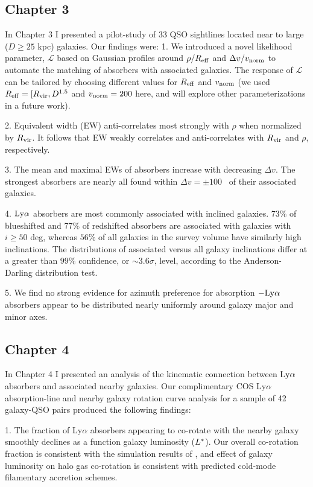 \subsection{Chapter 3}
In Chapter 3 I presented a pilot-study of 33 QSO sightlines located near to large ($D \ge 25$ kpc) galaxies. Our findings were:
1. We introduced a novel likelihood parameter, $\mathcal{L}$ based on Gaussian profiles around $\rho / R_{\rm eff}$ and $\Delta v / v_{\rm norm}$ to automate the matching of absorbers with associated galaxies. The response of $\mathcal{L}$ can be tailored by choosing different values for $R_{\rm eff}$ and $v_{\rm norm}$ (we used $R_{\rm eff} = [R_{\rm vir}, D^{\rm 1.5}$ and $v_{\rm norm} = 200$ \kms here, and will explore other parameterizations in a future work).

2. Equivalent width (EW) anti-correlates most strongly with $\rho$ when normalized by $R_{\rm vir}$. It follows that EW weakly correlates and anti-correlates with $R_{\rm vir}$ and $\rho$, respectively.

3. The mean and maximal EWs of absorbers increase with decreasing $\Delta v$. The strongest absorbers are nearly all found within $\Delta v = \pm 100$ \kms~of their associated galaxies.

4. $\rm Ly\alpha$ absorbers are most commonly associated with inclined galaxies. $73\%$ of blueshifted and $77\%$ of redshifted absorbers are associated with galaxies with $i \ge 50$ deg, whereas $56\%$ of all galaxies in the survey volume have similarly high inclinations. The distributions of associated versus all galaxy inclinations differ at a greater than $99\%$ confidence, or $\sim 3.6 \sigma$, level, according to the Anderson-Darling distribution test.

5. We find no strong evidence for azimuth preference for absorption $-\rm Ly\alpha$ absorbers appear to be distributed nearly uniformly around galaxy major and minor axes.

\subsection{Chapter 4}
In Chapter 4 I presented an analysis of the kinematic connection between $\rm Ly\alpha$ absorbers and associated nearby galaxies. Our complimentary COS Ly$\alpha$ absorption-line and nearby galaxy rotation curve analysis for a sample of 42 galaxy-QSO pairs produced the following findings:

1. The fraction of Ly$\alpha$ absorbers appearing to co-rotate with the nearby galaxy smoothly declines as a function galaxy luminosity ($L^{\**}$). Our overall co-rotation fraction is consistent with the simulation results of \cite{stewart2011b, stewart2013}, and effect of galaxy luminosity on halo gas co-rotation is consistent with predicted cold-mode filamentary accretion schemes. 

